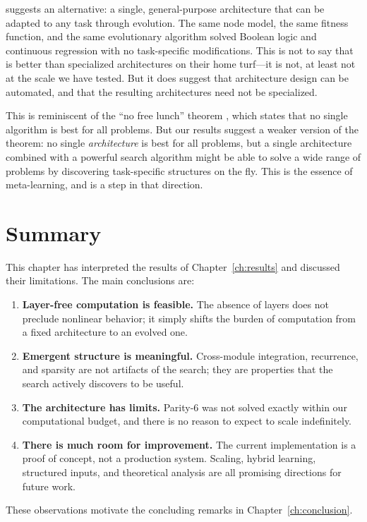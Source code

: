 \modnet{} suggests an alternative: a single, general-purpose
architecture that can be adapted to any task through evolution. The
same node model, the same fitness function, and the same evolutionary
algorithm solved Boolean logic and continuous regression with no
task-specific modifications. This is not to say that \modnet{} is
better than specialized architectures on their home turf---it is
not, at least not at the scale we have tested. But it does suggest
that architecture design can be automated, and that the resulting
architectures need not be specialized.

This is reminiscent of the ``no free lunch'' theorem
\citep{wolpert1997no}, which states that no single algorithm is best
for all problems. But our results suggest a weaker version of the
theorem: no single \emph{architecture} is best for all problems, but
a single architecture combined with a powerful search algorithm might
be able to solve a wide range of problems by discovering
task-specific structures on the fly. This is the essence of
meta-learning, and \modnet{} is a step in that direction.

\section{Summary}
\label{sec:discussion-summary}

This chapter has interpreted the results of Chapter~\ref{ch:results}
and discussed their limitations. The main conclusions are:

\begin{enumerate}
  \item \textbf{Layer-free computation is feasible.} The absence of
    layers does not preclude nonlinear behavior; it simply shifts the
    burden of computation from a fixed architecture to an evolved one.

  \item \textbf{Emergent structure is meaningful.} Cross-module
    integration, recurrence, and sparsity are not artifacts of the
    search; they are properties that the search actively discovers to
    be useful.

  \item \textbf{The architecture has limits.} Parity-6 was not solved
    exactly within our computational budget, and there is no reason to
    expect \modnet{} to scale indefinitely.

  \item \textbf{There is much room for improvement.} The current
    implementation is a proof of concept, not a production system.
    Scaling, hybrid learning, structured inputs, and theoretical
    analysis are all promising directions for future work.
\end{enumerate}

These observations motivate the concluding remarks in
Chapter~\ref{ch:conclusion}.